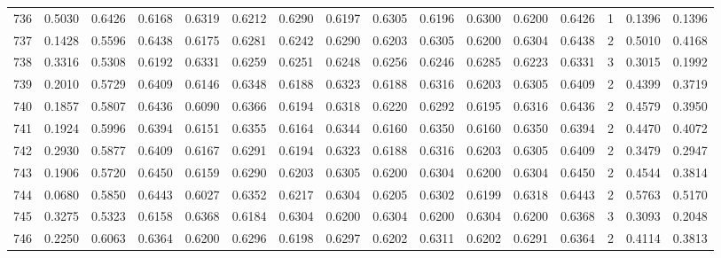 \begin{tabular}{lrrrrrrrrrrrrrrr}
736 &      0.5030 &  0.6426 &  0.6168 &  0.6319 &  0.6212 &  0.6290 &  0.6197 &  0.6305 &  0.6196 &  0.6300 &   0.6200 &     0.6426 &      1 &                    0.1396 &                     0.1396 \\
737 &      0.1428 &  0.5596 &  0.6438 &  0.6175 &  0.6281 &  0.6242 &  0.6290 &  0.6203 &  0.6305 &  0.6200 &   0.6304 &     0.6438 &      2 &                    0.5010 &                     0.4168 \\
738 &      0.3316 &  0.5308 &  0.6192 &  0.6331 &  0.6259 &  0.6251 &  0.6248 &  0.6256 &  0.6246 &  0.6285 &   0.6223 &     0.6331 &      3 &                    0.3015 &                     0.1992 \\
739 &      0.2010 &  0.5729 &  0.6409 &  0.6146 &  0.6348 &  0.6188 &  0.6323 &  0.6188 &  0.6316 &  0.6203 &   0.6305 &     0.6409 &      2 &                    0.4399 &                     0.3719 \\
740 &      0.1857 &  0.5807 &  0.6436 &  0.6090 &  0.6366 &  0.6194 &  0.6318 &  0.6220 &  0.6292 &  0.6195 &   0.6316 &     0.6436 &      2 &                    0.4579 &                     0.3950 \\
741 &      0.1924 &  0.5996 &  0.6394 &  0.6151 &  0.6355 &  0.6164 &  0.6344 &  0.6160 &  0.6350 &  0.6160 &   0.6350 &     0.6394 &      2 &                    0.4470 &                     0.4072 \\
742 &      0.2930 &  0.5877 &  0.6409 &  0.6167 &  0.6291 &  0.6194 &  0.6323 &  0.6188 &  0.6316 &  0.6203 &   0.6305 &     0.6409 &      2 &                    0.3479 &                     0.2947 \\
743 &      0.1906 &  0.5720 &  0.6450 &  0.6159 &  0.6290 &  0.6203 &  0.6305 &  0.6200 &  0.6304 &  0.6200 &   0.6304 &     0.6450 &      2 &                    0.4544 &                     0.3814 \\
744 &      0.0680 &  0.5850 &  0.6443 &  0.6027 &  0.6352 &  0.6217 &  0.6304 &  0.6205 &  0.6302 &  0.6199 &   0.6318 &     0.6443 &      2 &                    0.5763 &                     0.5170 \\
745 &      0.3275 &  0.5323 &  0.6158 &  0.6368 &  0.6184 &  0.6304 &  0.6200 &  0.6304 &  0.6200 &  0.6304 &   0.6200 &     0.6368 &      3 &                    0.3093 &                     0.2048 \\
746 &      0.2250 &  0.6063 &  0.6364 &  0.6200 &  0.6296 &  0.6198 &  0.6297 &  0.6202 &  0.6311 &  0.6202 &   0.6291 &     0.6364 &      2 &                    0.4114 &                     0.3813 \\

\end{tabular}
